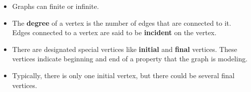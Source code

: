 \documentclass[a4paper]{article}
\begin{document}
\begin{itemize}
\begin{figure}[H]
\begin{subfigure}[b]{0.45\textwidth}
            \caption{A directed graph}
        \end{subfigure}
    \end{figure}
    \item Graphs can finite or infinite.
    \item The \textbf{degree} of a vertex is the number of edges that are connected to it. Edges connected to a vertex are said to be \textbf{incident} on the vertex.
    \item There are designated special vertices like \textbf{initial} and \textbf{final} vertices. These vertices indicate beginning and end of a property that the graph is modeling.
    \item Typically, there is only one initial vertex, but there could be several final vertices.
    \begin{figure}[H]
        \centering
\end{figure}
\end{itemize}
\end{document}

